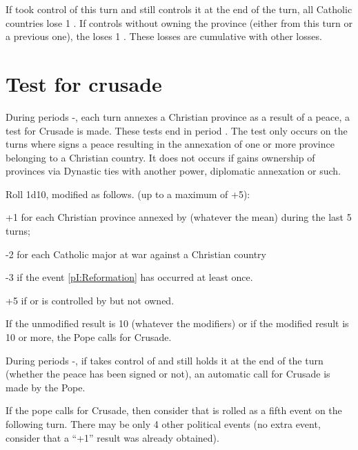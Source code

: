 \aparag[\villeRoma]
\bparag If \TUR took control of \villeRoma this turn and still controls it
at the end of the turn, all Catholic countries lose 1 \STAB.
\bparag If \TUR controls \villeRoma without owning the province (either from
this turn or a previous one), the \SDCF loses 1 \STAB.
\bparag These losses are cumulative with other losses.

\section{Test for crusade}\label{chPeace:Crusade}
\aparag During periods -, each turn \TUR annexes a
Christian province as a result of a peace, a test for Crusade is made.
\bparag These tests end in period .
\bparag The test only occurs on the turns where \TUR signs a peace resulting
in the annexation of one or more province belonging to a Christian country. It
does not occurs if \TUR gains ownership of provinces via Dynastic ties with
another power, diplomatic annexation or such.

\bparag Roll 1d10, modified as follows.
\bparag[Modifiers] (up to a maximum of +5):
\begin{modlist}
\item[+1] for each Christian province annexed by \TUR (whatever the mean)
  during the last 5 turns;
\item[-2] for each Catholic major at war against a Christian country
\item[-3] if the event \ref{pI:Reformation} has occurred at least once.
\item[+5] if \villeVienne or \villeRoma is controlled by \TUR but not owned.
\end{modlist}
\bparag If the unmodified result is 10 (whatever the modifiers) or if the
modified result is 10 or more, the Pope calls for Crusade.

\aparag[\villeRoma] During periods -, if \TUR takes
control of \villeRoma and still holds it at the end of the turn (whether the
peace has been signed or not), an automatic call for Crusade is made by the
Pope.

\aparag[Crusade] If the pope calls for Crusade, then consider that
 is rolled as a fifth event on the following turn. There
may be only 4 other political events (no extra event, consider that a ``+1''
result was already obtained).


